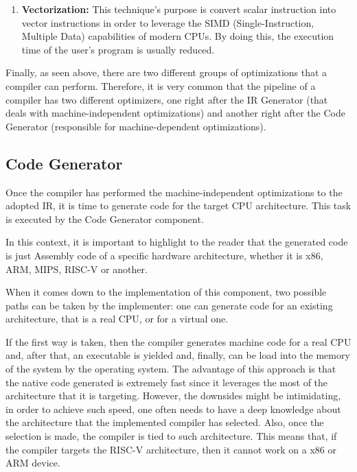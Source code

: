 \begin{itemize}
\begin{enumerate}
            \item \textbf{Vectorization:} This technique's purpose is convert scalar instruction into vector instructions in order to leverage the SIMD (Single-Instruction, Multiple Data) capabilities of modern CPUs. By doing this, the execution time of the user's program is usually reduced.
        
        \end{enumerate}
\end{itemize}

Finally, as seen above, there are two different groups of optimizations that a compiler can perform. Therefore, it is very common that the pipeline of a compiler has two different optimizers, one right after the IR Generator (that deals with machine-independent optimizations) and another right after the Code Generator (responsible for machine-dependent optimizations).

\subsection{Code Generator}
Once the compiler has performed the machine-independent optimizations to the adopted IR, it is time to generate code for the target CPU architecture. This task is executed by the Code Generator component.

In this context, it is important to highlight to the reader that the generated code is just Assembly code of a specific hardware architecture, whether it is x86, ARM, MIPS, RISC-V or another.

When it comes down to the implementation of this component, two possible paths can be taken by the implementer: one can generate code for an existing architecture, that is a real CPU, or for a virtual one.

If the first way is taken, then the compiler generates machine code for a real CPU and, after that, an executable is yielded and, finally, can be load into the memory of the system by the operating system. The advantage of this approach is that the native code generated is extremely fast since it leverages the most of the architecture that it is targeting. However, the downsides might be intimidating, in order to achieve such speed, one often needs to have a deep knowledge about the architecture that the implemented compiler has selected. Also, once the selection is made, the compiler is tied to such architecture. This means that, if the compiler targets the RISC-V architecture, then it cannot work on a x86 or ARM device.

